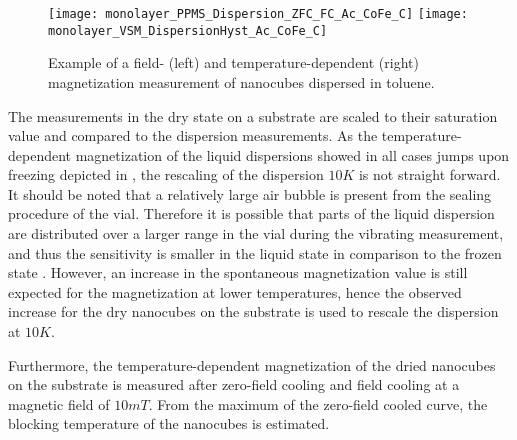 \documentclass[\main/dresen_thesis.tex]{subfiles}
\begin{document}
    \begin{figure}[tb]
      \centering
      \texttt{[image: monolayer\_PPMS\_Dispersion\_ZFC\_FC\_Ac\_CoFe\_C]}
      \texttt{[image: monolayer\_VSM\_DispersionHyst\_Ac\_CoFe\_C]}
      \caption{\label{fig:monolayers:charMethods:JumpMagnetization}Example of a field- (left) and temperature-dependent (right) magnetization measurement of nanocubes dispersed in toluene.}
    \end{figure}

    The measurements in the dry state on a substrate are scaled to their saturation value and compared to the dispersion measurements.
    As the temperature-dependent magnetization of the liquid dispersions showed in all cases jumps upon freezing depicted in , the rescaling of the dispersion $10 \unit{K}$ is not straight forward.
    It should be noted that a relatively large air bubble is present from the sealing procedure of the vial.
    Therefore it is possible that parts of the liquid dispersion are distributed over a larger range in the vial during the vibrating measurement, and thus the sensitivity is smaller in the liquid state in comparison to the frozen state \cite{Boekelheide_2016_Artif}.
    However, an increase in the spontaneous magnetization value is still expected for the magnetization at lower temperatures, hence the observed increase for the dry nanocubes on the substrate is used to rescale the dispersion at $10 \unit{K}$.

    Furthermore, the temperature-dependent magnetization of the dried nanocubes on the substrate is measured after zero-field cooling and field cooling at a magnetic field of $10 \unit{mT}$.
    From the maximum of the zero-field cooled curve, the blocking temperature of the nanocubes is estimated.
\end{document}
